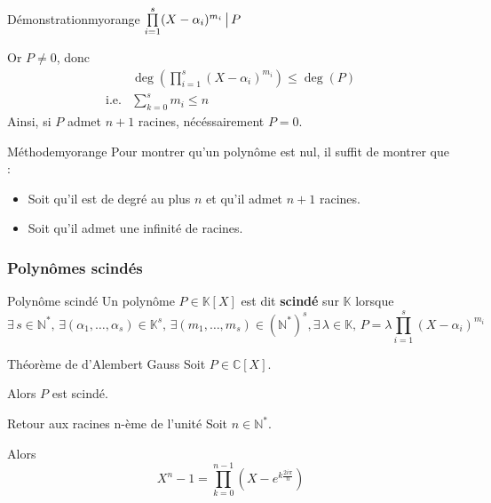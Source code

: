     \begin{demo}{Démonstration}{myorange}
        $ \prod\limits_{i=1}^s (X-\alpha_i)^{m_i} \, \big| \, P$
    
        Or $P \neq 0$, donc \begin{align*}
            & \deg\left(\prod\limits_{i=1}^s (X-\alpha_i)^{m_i}\right) \leq \deg(P) \\
            \text{i.e.} & \sum\limits_{k=0}^s m_i \leq n 
        \end{align*}
        Ainsi, si $P$ admet $n + 1$ racines, nécéssairement $P = 0$.
    \end{demo}
    
    \begin{omed}{Méthode}{myorange}
        Pour montrer qu’un polynôme est nul, il suffit de montrer que :
        \begin{itemize}
            \item Soit qu’il est de degré au plus $n$ et qu’il admet $n+1$ racines.
            \item Soit qu’il admet une infinité de racines.
        \end{itemize}
    \end{omed}

    \subsubsection{Polynômes scindés}

    \begin{defi}{Polynôme scindé}{}
        Un polynôme $P \in \mathbb{K}[X]$ est dit \textbf{scindé} sur $\mathbb{K}$ lorsque 
        \[ \exists \, s \in \mathbb{N}^*, \, \exists(\alpha_1,\ldots,\alpha_s) \in \mathbb{K}^s, \, \exists (m_1,\ldots,m_s) \in (\mathbb{N}^*)^s, \exists \, \lambda \in \mathbb{K}, \, P = \lambda \prod\limits_{i=1}^s (X-\alpha_i)^{m_i} \]
    \end{defi}
    
    \begin{theo}{Théorème de d’Alembert Gauss}{}
        Soit $P \in \mathbb{C}[X]$.
    
        Alors $P$ est scindé.
    \end{theo}
    
    \begin{prop}{Retour aux racines n-ème de l’unité}{}
        Soit $n \in \mathbb{N}^*$.
    
        Alors \[ X^n -1 = \prod\limits_{k = 0}^{n-1} (X - e^{k \frac{2i \pi}{n}}) \]
    \end{prop}
    
